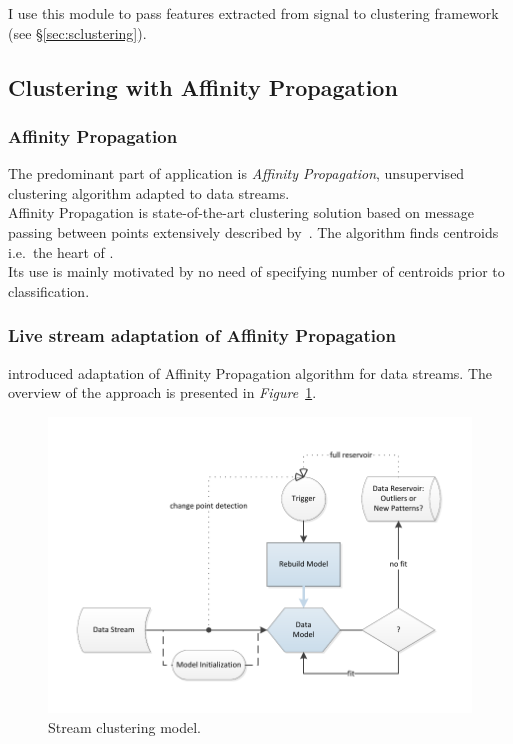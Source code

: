\documentclass[11pt, letterpaper]{article}            %
\begin{document}
I use this module to pass features extracted from signal to clustering framework (see §\ref{sec:sclustering}).

\subsection{Clustering with Affinity Propagation\label{sec:sclustering}}
\subsubsection{Affinity Propagation}
The predominant part of application is \emph{Affinity Propagation}, unsupervised clustering algorithm adapted to data streams.\\
Affinity Propagation is state-of-the-art clustering solution based on message passing between points extensively described by~\citep{frey07affinitypropagation}. The algorithm finds centroids i.e.\ the heart of .\\

Its use is mainly motivated by no need of specifying number of centroids prior to classification.

\subsubsection{Live stream adaptation of Affinity Propagation}
\citep{zhang2013data} introduced adaptation of Affinity Propagation algorithm for data streams. The overview of the approach is presented in \emph{Figure}~\ref{fig:APC}.\\

\begin{figure}[htbp]
    \centering
    \includegraphics[width=\textwidth]{./gfx/APC.pdf}
  \caption{Stream clustering model.\label{fig:APC}}
\end{figure}
\end{document}
